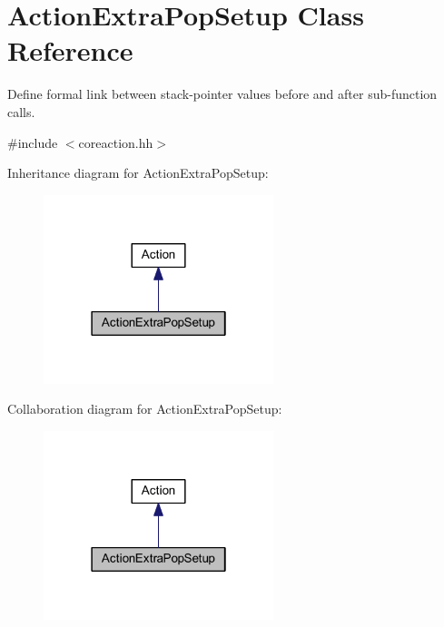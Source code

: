 \hypertarget{class_action_extra_pop_setup}{}\section{Action\+Extra\+Pop\+Setup Class Reference}
\label{class_action_extra_pop_setup}


Define formal link between stack-\/pointer values before and after sub-\/function calls.  




{\ttfamily \#include $<$coreaction.\+hh$>$}



Inheritance diagram for Action\+Extra\+Pop\+Setup\+:
\nopagebreak
\begin{figure}[H]
\begin{center}
\leavevmode
\includegraphics[width=190pt]{class_action_extra_pop_setup__inherit__graph}
\end{center}
\end{figure}


Collaboration diagram for Action\+Extra\+Pop\+Setup\+:
\nopagebreak
\begin{figure}[H]
\begin{center}
\leavevmode
\includegraphics[width=190pt]{class_action_extra_pop_setup__coll__graph}
\end{center}
\end{figure}
